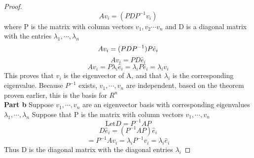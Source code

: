 \documentclass[twoside]{report}
\begin{document}
\begin{proof}
   \[
   Av_{i} = (PDP^{-1}v_{i})
   \]
where P is the matrix with column vectors $v_{1},v_{2} \cdots v_{n}$ and D is a diagonal matrix with the entries $\lambda_{1},\cdots, \lambda_{n}$
\[
Av_i = (PDP^{-1})P \hat{e}_{i} \\
\]
\[
   Av_{i} = PD\hat{e}_i
\]
\[
Av_{i} = P\lambda_{i} \hat{e}_{i} = \lambda_{i} P \hat{e}_{i} = \lambda_i v_{i}
\]
This proves that $v_{i}$ is the eigenvector of A, and that $\lambda_{i}$ is the corresponding eigenvalue.
Because $P^{-1}$ exists, $v_{1},\cdots,v_{n}$ are independent, based on the theorem proven earlier, this is the basis for $R^{n}$ \\
\textbf{Part b}
Suppose $v_{1},\cdots, v_{n}$ are an eigenvector basis with corresponding eigenvalues $\lambda_{1},\cdots,\lambda_{n}$
Suppose that P is the matrix with column vectors $v_{1},\cdots,v_{n}$ \[
   \text{Let} D = P^{-1}AP 
\]
\[
   D \hat{e}_{i} = (P^{-1}AP)\hat{e}_i
\]
\[
   = P^{-1} A v_{i} = \lambda_{i} P^{-1}v_{i} = \lambda_{i} \hat{e}_{i}
\]
Thus D is the diagonal matrix with the diagonal entries $\lambda_{i}$
\end{proof}
\end{document}
